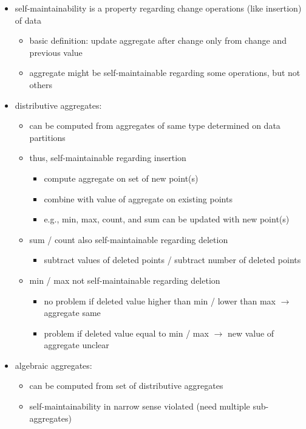 \documentclass[12pt]{article}
\begin{document}
\begin{itemize}[left=0pt, nosep]
	\item self-maintainability is a property regarding change operations (like insertion) of data
	\begin{itemize}[left=0pt, nosep]
		\item basic definition: update aggregate after change only from change and previous value
		\item aggregate might be self-maintainable regarding some operations, but not others
	\end{itemize}
	\item distributive aggregates:
	\begin{itemize}[left=0pt, nosep]
		\item can be computed from aggregates of same type determined on data partitions
		\item thus, self-maintainable regarding insertion
		\begin{itemize}[left=0pt, nosep]
			\item compute aggregate on set of new point(s)
			\item combine with value of aggregate on existing points
			\item e.g., min, max, count, and sum can be updated with new point(s)
		\end{itemize}
		\item sum / count also self-maintainable regarding deletion
		\begin{itemize}[left=0pt, nosep]
			\item subtract values of deleted points / subtract number of deleted points
		\end{itemize}
		\item min / max not self-maintainable regarding deletion
		\begin{itemize}[left=0pt, nosep]
			\item no problem if deleted value higher than min / lower than max $\rightarrow$ aggregate same
			\item problem if deleted value equal to min / max $\rightarrow$ new value of aggregate unclear
		\end{itemize}
	\end{itemize}
	\item algebraic aggregates:
	\begin{itemize}[left=0pt, nosep]
		\item can be computed from set of distributive aggregates
		\item self-maintainability in narrow sense violated (need multiple sub-aggregates)

\end{itemize}
\end{itemize}
\end{document}
